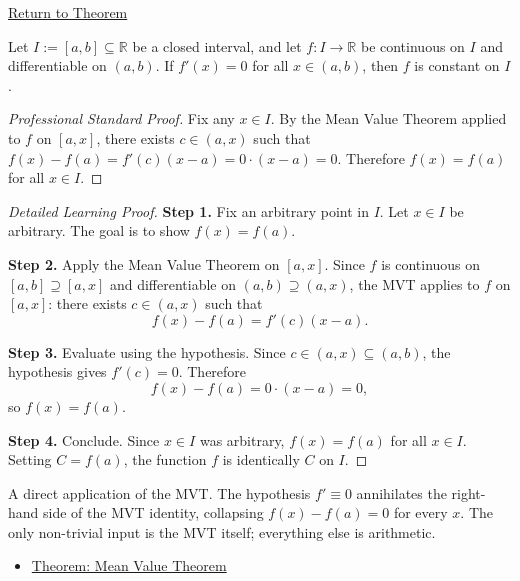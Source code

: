 \newpage
{}
\label{prf:zero-derivative-implies-constant}

\begin{remark*}[Return]
\hyperref[thm:zero-derivative-implies-constant]{Return to Theorem}
\end{remark*}

\begin{theorem*}
Let $I := [a,b] \subseteq \mathbb{R}$ be a closed interval, and let $f : I \to \mathbb{R}$ be continuous on $I$ and differentiable on $(a,b)$. If $f'(x) = 0$ for all $x \in (a,b)$, then $f$ is constant on $I$.
\end{theorem*}

\begin{proof}[Professional Standard Proof]
\LRAProofBodyStart
Fix any $x \in I$. By the Mean Value Theorem applied to $f$ on $[a,x]$, there exists $c \in (a,x)$ such that $f(x) - f(a) = f'(c)(x-a) = 0 \cdot (x-a) = 0$. Therefore $f(x) = f(a)$ for all $x \in I$.
\end{proof}

\begin{proof}[Detailed Learning Proof]
\LRAProofBodyStart

\textbf{Step 1.} Fix an arbitrary point in $I$. Let $x \in I$ be arbitrary. The goal is to show $f(x) = f(a)$.

\textbf{Step 2.} Apply the Mean Value Theorem on $[a,x]$. Since $f$ is continuous on $[a,b] \supseteq [a,x]$ and differentiable on $(a,b) \supseteq (a,x)$, the MVT applies to $f$ on $[a,x]$: there exists $c \in (a,x)$ such that
\[
f(x) - f(a) = f'(c)(x-a).
\]

\textbf{Step 3.} Evaluate using the hypothesis. Since $c \in (a,x) \subseteq (a,b)$, the hypothesis gives $f'(c) = 0$. Therefore
\[
f(x) - f(a) = 0 \cdot (x - a) = 0,
\]
so $f(x) = f(a)$.

\textbf{Step 4.} Conclude. Since $x \in I$ was arbitrary, $f(x) = f(a)$ for all $x \in I$. Setting $C = f(a)$, the function $f$ is identically $C$ on $I$.
\end{proof}

\begin{remark*}
A direct application of the MVT. The hypothesis $f' \equiv 0$ annihilates the right-hand side of the MVT identity, collapsing $f(x) - f(a) = 0$ for every $x$. The only non-trivial input is the MVT itself; everything else is arithmetic.
\end{remark*}

\begin{dependencies}
\begin{itemize}
  \item \hyperref[thm:mean-value-theorem]{Theorem: Mean Value Theorem}
\end{itemize}
\end{dependencies}

\clearpage
